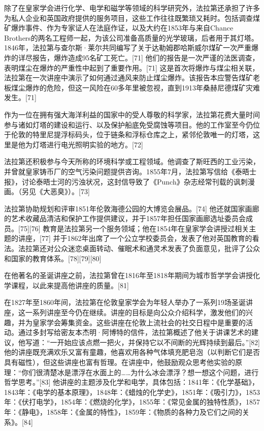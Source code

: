 除了在皇家学会进行化学、电学和磁学等领域的科学研究外，法拉第还承担了许多为私人企业和英国政府提供的服务项目，这些工作往往既繁琐又耗时。包括调查煤矿爆炸事件、作为专家证人在法庭作证，以及大约在1853年与来自Chance Brothers的两名工程师一起，为该公司准备高质量的光学玻璃，后者用于其灯塔。1846年，法拉第与查尔斯·莱尔共同编写了关于达勒姆郡哈斯威尔煤矿一次严重爆炸的详尽报告，爆炸造成95名矿工死亡。[71] 他们的报告是一次严谨的法医调查，表明煤尘在爆炸的严重性中起到了重要作用。[71] 这是首次将爆炸与煤尘相关联，法拉第在一次讲座中演示了如何通过通风来防止煤尘爆炸。该报告本应警告煤矿老板煤尘爆炸的危险，但这一风险在60多年里被忽视，直到1913年桑赫尼德煤矿灾难发生。[71]

作为一位在拥有强大海洋利益的国家中的受人尊敬的科学家，法拉第花费大量时间参与诸如灯塔的建设和运行、以及保护船底免受腐蚀等项目。他的工作室至今仍位于伦敦的特里尼提浮标码头，位于链条和浮标仓库之上，紧邻伦敦唯一的灯塔，这里是他为灯塔进行电光照明实验的地方。[72]

法拉第还积极参与今天所称的环境科学或工程领域。他调查了斯旺西的工业污染，并曾就皇家铸币厂的空气污染问题提供咨询。1855年7月，法拉第写信给《泰晤士报》，讨论泰晤士河的污浊状况，这封信导致了《Punch》杂志经常刊载的讽刺漫画。（另见《大恶臭》）。[73]

法拉第协助规划和评审1851年伦敦海德公园的大博览会展品。[74] 他还就国家画廊的艺术收藏品清洁和保护工作提供建议，并于1857年担任国家画廊选址委员会成员。[75][76] 教育是法拉第另一个服务领域；他在1854年在皇家学会讲授过相关主题的讲座，[77] 并于1862年出席了一个公立学校委员会，发表了他对英国教育的看法。法拉第还对公众迷恋桌面转动、催眠术和通灵术发表了负面意见，批评了公众和国家的教育体系。[78][79][80]

在他著名的圣诞讲座之前，法拉第曾在1816年至1818年期间为城市哲学学会讲授化学课程，以此来提高他讲座的质量。[81]

在1827年至1860年间，法拉第在伦敦皇家学会为年轻人举办了一系列19场圣诞讲座，这一系列讲座至今仍在继续。讲座的目标是向公众介绍科学，激发他们的兴趣，并为皇家学会筹集资金。这些讲座在伦敦上流社会的社交日程中是重要的活动。通过多封写给密友本杰明·阿博特的信件，法拉第概述了他关于讲课艺术的建议，他写道：“一开始应该点燃一把火，并保持它以不间断的光辉持续到最后。”[82] 他的讲座既充满欢乐又富有童趣，他喜欢用各种气体填充肥皂泡（以判断它们是否具有磁性），但这些讲座也富有哲理。在讲座中，他鼓励观众思考他实验的原理：“你们很清楚冰是漂浮在水面上的……为什么冰会漂浮？想一想这个问题，进行哲学思考。”[83] 他讲座的主题涉及化学和电学，具体包括：1841年：《化学基础》，1843年：《电学的基本原理》，1848年：《蜡烛的化学史》，1851年：《吸引力》，1853年：《伏打电学》，1854年：《燃烧的化学》，1855年：《常见金属的独特性质》，1857年：《静电》，1858年：《金属的特性》，1859年：《物质的各种力及它们之间的关系》。[84]

